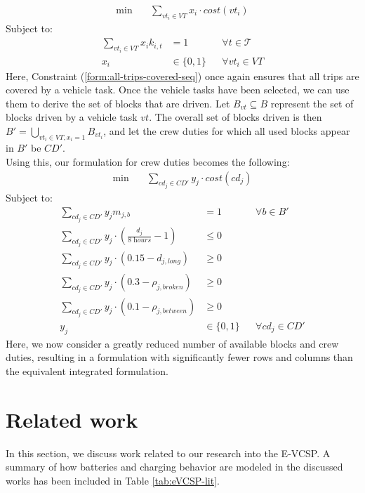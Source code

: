 \documentclass[]{article}
\begin{document}
\begin{align}
\min \quad
& \sum_{vt_i \in VT} x_{i} \cdot cost(vt_i)
\end{align}
Subject to:
\begin{align}
\sum_{vt_i \in VT} x_{i}k_{i,t} &= 1 && \forall t \in \mathcal{T} \label{form:all-trips-covered-seq} \\
x_{i} &\in \{ 0, 1 \} && \forall vt_i \in VT
\end{align}
Here, Constraint (\ref{form:all-trips-covered-seq}) once again ensures that all trips are covered by a vehicle task. Once the vehicle tasks have been selected, we can use them to derive the set of blocks that are driven. Let $B_{vt} \subseteq B$ represent the set of blocks driven by a vehicle task $vt$. The overall set of blocks driven is then $B' = \bigcup_{vt_i \in VT, x_i = 1}B_{vt_i}$, and let the crew duties for which all used blocks appear in $B'$ be $CD'$. \\
Using this, our formulation for crew duties becomes the following:
\begin{align}
\min \quad
& \sum_{cd_j \in CD'} y_{j} \cdot cost(cd_j)  
\end{align}
Subject to:
\begin{align}
\sum_{cd_j \in CD'} y_j m_{j,b} &= 1  && \forall b \in B' \label{form:all-blocks-covered-seq} \\
\sum_{cd_j \in CD'} y_{j} \cdot (\frac{d_{j}}{\textit{8 hours}} - 1) &\leq 0 && \\
\sum_{cd_j \in CD'} y_{j} \cdot (0.15 - d_{j,\textit{long}}) &\geq 0 && \\
\sum_{cd_j \in CD'} y_{j} \cdot (0.3 - \rho_{j,\textit{broken}}) &\geq 0 && \\
\sum_{cd_j \in CD'} y_{j} \cdot (0.1 - \rho_{j,\textit{between}}) &\geq 0 && \\
y_{j} &\in \{ 0, 1 \} && \forall cd_j \in CD'
\end{align}
Here, we now consider a greatly reduced number of available blocks and crew duties, resulting in a formulation with significantly fewer rows and columns than the equivalent integrated formulation.

\section{Related work}
In this section, we discuss work related to our research into the E-VCSP. A summary of how batteries and charging behavior are modeled in the discussed works has been included in Table \ref{tab:eVCSP-lit}.
\end{document}
